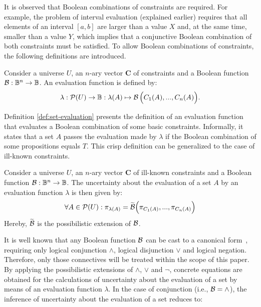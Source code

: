 It is observed that Boolean combinations of constraints are required. For example, the problem of interval evaluation (explained earlier) requires that all elements of an interval $[a,b]$ are larger than a value $X$ and, at the same time, smaller than a value $Y$, which implies that a conjunctive Boolean combination of both constraints must be satisfied. To allow Boolean combinations of constraints, the following definitions are introduced.
\begin{definition}
\label{def:set-evaluation}
Consider a universe $U$, an $n$-ary vector $\mathbf{C}$ of constraints and a Boolean function $\operatorname*{\mathcal{B}}:\mathbb{B}^{n}\rightarrow\mathbb{B}$. An evaluation function is defined by:
\begin{equation}
\lambda:\mathcal{P}(U)\rightarrow\mathbb{B}:\lambda(A)\mapsto\operatorname*{\mathcal{B}}\Big(C_{1}(A),...,C_{n}(A)\Big).
\end{equation}
\end{definition}
Definition \ref{def:set-evaluation} presents the definition of an evaluation function that evaluates a Boolean combination of some basic constraints. Informally, it states that a set $A$ passes the evaluation made by $\lambda$ if the Boolean combination of some propositions equals $T$. This crisp definition can be generalized to the case of ill-known constraints.
\begin{definition}
\label{def:ill-known-sets}
Consider a universe $U$, an $n$-ary vector $\mathbf{C}$ of ill-known constraints and a Boolean function $\operatorname*{\mathcal{B}}:\mathbb{B}^{n}\rightarrow\mathbb{B}$. The uncertainty about the evaluation of a set $A$ by an evaluation function $\lambda$ is then given by:
\begin{equation}
\forall A\in\mathcal{P}(U):\pi_{\lambda(A)}=\widetilde{\operatorname*{\mathcal{B}}}\Big(\pi_{C_1(A)},...,\pi_{C_n(A)}\Big)\\
\end{equation}
Hereby, $\widetilde{\operatorname*{\mathcal{B}}}$ is the possibilistic extension of $\operatorname*{\mathcal{B}}$.
\end{definition}
It is well known that any Boolean function $\operatorname*{\mathcal{B}}$ can be cast to a canonical form~\cite{McCluskey1965}, requiring only logical conjunction $\wedge$, logical disjunction $\vee$ and logical negation. Therefore, only those connectives will be treated within the scope of this paper. By applying the possibilistic extensions of $\wedge$, $\vee$ and $\neg$, concrete equations are obtained for the calculations of uncertainty about the evaluation of a set by means of an evaluation function $\lambda$. In the case of conjunction (i.e., $\operatorname*{\mathcal{B}}=\wedge$), the inference of uncertainty about the evaluation of a set reduces to:
